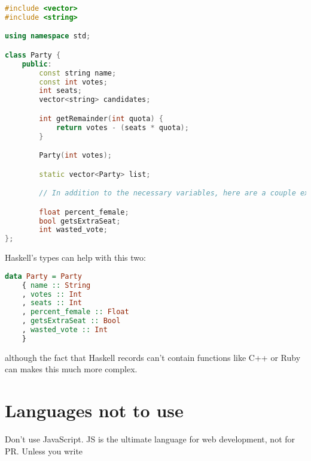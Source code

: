 \documentclass{article}
\begin{document}
    \begin{lstlisting}[language=C++]
#include <vector>
#include <string>

using namespace std;

class Party {
    public:
        const string name;
        const int votes;
        int seats;
        vector<string> candidates;

        int getRemainder(int quota) {
            return votes - (seats * quota);
        }

        Party(int votes);

        static vector<Party> list;

        // In addition to the necessary variables, here are a couple extra

        float percent_female;
        bool getsExtraSeat;
        int wasted_vote;
};
    \end{lstlisting}

    Haskell's types can help with this two:

    \begin{lstlisting}[language=Haskell]
data Party = Party
    { name :: String
    , votes :: Int
    , seats :: Int
    , percent_female :: Float
    , getsExtraSeat :: Bool
    , wasted_vote :: Int
    }
    \end{lstlisting}

    although the fact that Haskell records can't contain functions like C++ or Ruby can makes this much more complex. 

    \section{Languages not to use}

    Don't use JavaScript. JS is the ultimate language for web development, not for PR. Unless you write 
\end{document}
